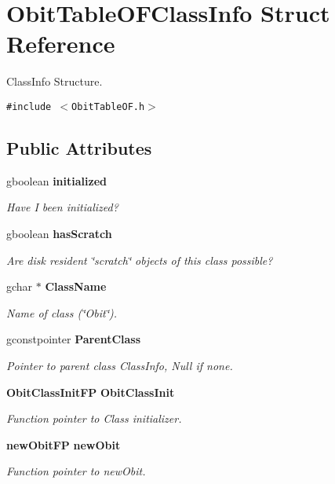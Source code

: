 \section{Obit\-Table\-OFClass\-Info Struct Reference}
\label{structObitTableOFClassInfo}
Class\-Info Structure.  


{\tt \#include $<$Obit\-Table\-OF.h$>$}

\subsection*{Public Attributes}
\begin{CompactItemize}
\item 
gboolean {\bf initialized}
\begin{CompactList}\small\item\em Have I been initialized? \item\end{CompactList}\item 
gboolean {\bf has\-Scratch}
\begin{CompactList}\small\item\em Are disk resident \char`\"{}scratch\char`\"{} objects of this class possible? \item\end{CompactList}\item 
gchar $\ast$ {\bf Class\-Name}
\begin{CompactList}\small\item\em Name of class (\char`\"{}Obit\char`\"{}). \item\end{CompactList}\item 
gconstpointer {\bf Parent\-Class}
\begin{CompactList}\small\item\em Pointer to parent class Class\-Info, Null if none. \item\end{CompactList}\item 
{\bf Obit\-Class\-Init\-FP} {\bf Obit\-Class\-Init}
\begin{CompactList}\small\item\em Function pointer to Class initializer. \item\end{CompactList}\item 
{\bf new\-Obit\-FP} {\bf new\-Obit}
\begin{CompactList}\small\item\em Function pointer to new\-Obit. \item\end{CompactList}\item 

\end{CompactItemize}
